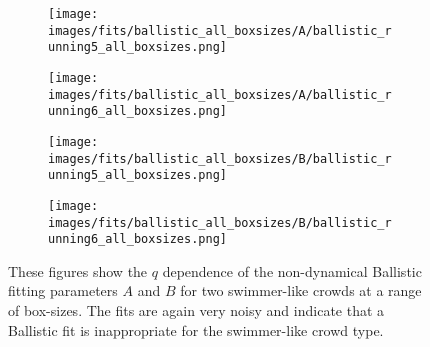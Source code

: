 \documentclass[10pt]{article}
\begin{document}
\begin{figure}[H]
\begin{subfigure}[t]{.5\textwidth}
  \centering
 \texttt{[image: images/fits/ballistic\_all\_boxsizes/A/ballistic\_running5\_all\_boxsizes.png]}
  \caption{}
\end{subfigure}%
\hfill
\begin{subfigure}[t]{.5\textwidth}
  \centering
  \texttt{[image: images/fits/ballistic\_all\_boxsizes/A/ballistic\_running6\_all\_boxsizes.png]}
  \caption{}
\end{subfigure}
\label{fig:running_ballistic_fits_A_all_boxsizes}
\par\bigskip
\begin{subfigure}[t]{.5\textwidth}
  \centering
 \texttt{[image: images/fits/ballistic\_all\_boxsizes/B/ballistic\_running5\_all\_boxsizes.png]}
  \caption{}
\end{subfigure}%
\hfill
\begin{subfigure}[t]{.5\textwidth}
  \centering
  \texttt{[image: images/fits/ballistic\_all\_boxsizes/B/ballistic\_running6\_all\_boxsizes.png]}
  \caption{}
\end{subfigure}
\caption{These figures show the $q$ dependence of the non-dynamical Ballistic fitting parameters $A$ and $B$ for two swimmer-like crowds at a range of box-sizes. The fits are again very noisy and indicate that a Ballistic fit is inappropriate for the swimmer-like crowd type.}
\label{fig:running_ballistic_fits_B_all_boxsizes}
\end{figure}
\end{document}
